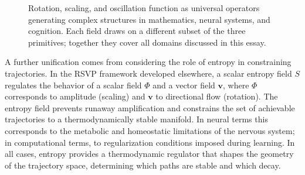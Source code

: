 \documentclass[11pt, a4paper]{article}
\theoremstyle{plain}
\theoremstyle{definition}
\theoremstyle{remark}
\begin{document}
\begin{figure}[h]
\centering
{}
\caption{Rotation, scaling, and oscillation function as universal operators generating
complex structures in mathematics, neural systems, and cognition. Each field draws on
a different subset of the three primitives; together they cover all domains discussed
in this essay.}
\end{figure}

A further unification comes from considering the role of entropy in constraining
trajectories. In the RSVP framework developed elsewhere, a scalar entropy field $S$
regulates the behavior of a scalar field $\Phi$ and a vector field $\mathbf{v}$, where
$\Phi$ corresponds to amplitude (scaling) and $\mathbf{v}$ to directional flow
(rotation). The entropy field prevents runaway amplification and constrains the set of
achievable trajectories to a thermodynamically stable manifold. In neural terms this
corresponds to the metabolic and homeostatic limitations of the nervous system; in
computational terms, to regularization conditions imposed during learning. In all cases,
entropy provides a thermodynamic regulator that shapes the geometry of the trajectory
space, determining which paths are stable and which decay.
\end{document}
